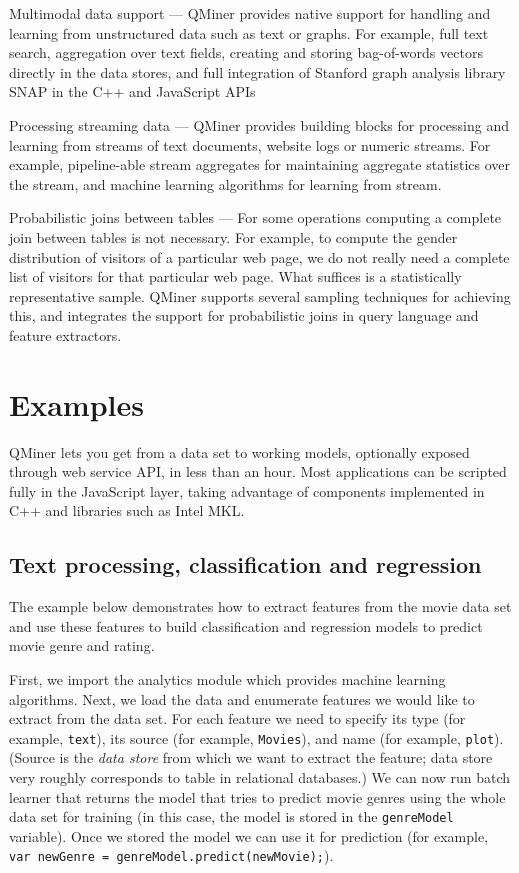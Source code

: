 \documentclass{article} %
\begin{document}
   Multimodal data support --- QMiner provides native support for handling and learning from unstructured data such as text or graphs. For example, full text search, aggregation over text fields, creating and storing bag-of-words vectors directly in the data stores, and full integration of Stanford graph analysis library SNAP in the C++ and JavaScript APIs
   
   Processing streaming data --- QMiner provides building blocks for processing and learning from streams of text documents, website logs or numeric streams. For example, pipeline-able stream aggregates for maintaining aggregate statistics over the stream, and machine learning algorithms for learning from stream.
   
   Probabilistic joins between tables --- For some operations computing a complete join between tables is not necessary. For example, to compute the gender distribution of visitors of a particular web page, we do not really need a complete list of visitors for that particular web page. What suffices is a statistically representative sample. QMiner supports several sampling techniques for achieving this, and integrates the support for probabilistic joins in query language and feature extractors.


\section{Examples}
   QMiner lets you get from a data set to working models, optionally exposed through web service API, in less than an hour. Most applications can be scripted fully in the JavaScript layer, taking advantage of components implemented in C++ and libraries such as Intel MKL. 

   \subsection{Text processing, classification and regression}
      The example below demonstrates how to extract features from the movie data set and use these features to build classification and regression models to predict movie genre and rating. 
      
      First, we import the analytics module which provides machine learning algorithms. Next, we load the data and enumerate features we would like to extract from the data set. For each feature we need to specify its type (for example, \texttt{text}), its source (for example, \texttt{Movies}), and name (for example, \texttt{plot}). (Source is the \emph{data store} from which we want to extract the feature; data store very roughly corresponds to table in relational databases.) We can now run batch learner that returns the model that tries to predict movie genres using the whole data set for training (in this case, the model is stored in the \texttt{genreModel} variable). Once we stored the model we can use it for prediction (for example, \texttt{var newGenre = genreModel.predict(newMovie);}). 
\end{document}
